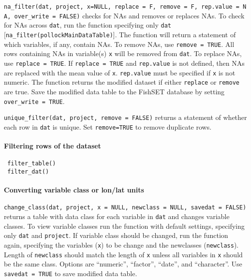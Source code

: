 \documentclass[
]{article}
\begin{document}
\texttt{na\_filter(dat,\ project,\ x=NULL,\ replace\ =\ F,\ remove\ =\ F,\ rep.value\ =\ NA,\ over\_write\ =\ FALSE)} checks for NAs and removes or replaces NAs. To check for NAs across \texttt{dat}, run the function specifying only \texttt{dat} {[}\texttt{na\_filter(pollockMainDataTable)}{]}. The function will return a statement of which variables, if any, contain NAs. To remove NAs, use \texttt{remove\ =\ TRUE}. All rows containing NAs in variable(s) \texttt{x} will be removed from \texttt{dat}. To replace NAs, use \texttt{replace\ =\ TRUE}. If \texttt{replace\ =\ TRUE} and \texttt{rep.value} is not defined, then NAs are replaced with the mean value of \texttt{x}. \texttt{rep.value} must be specified if \texttt{x} is not numeric. The function returns the modified dataset if either \texttt{replace} or \texttt{remove} are true. Save the modified data table to the FishSET database by setting \texttt{over\_write\ =\ TRUE}.

\texttt{unique\_filter(dat,\ project,\ remove\ =\ FALSE)} returns a statement of whether each row in \texttt{dat} is unique. Set \texttt{remove=TRUE} to remove duplicate rows.

\hypertarget{filtering-rows-of-the-dataset-1}{%
\paragraph{Filtering rows of the dataset}\label{filtering-rows-of-the-dataset-1}}

\begin{verbatim}
 filter_table()      
 filter_dat()     
\end{verbatim}

\hypertarget{converting-variable-class-or-lonlat-units}{%
\paragraph{Converting variable class or lon/lat units}\label{converting-variable-class-or-lonlat-units}}

\texttt{change_class(dat,\ project,\ x\ =\ NULL,\ newclass\ =\ NULL,\ savedat\ =\ FALSE)} returns a table with data class for each variable in \texttt{dat} and changes variable classes. To view variable classes run the function with default settings, specifying only \texttt{dat} and \texttt{project}. If variable class should be changed, run the function again, specifying the variables (\texttt{x}) to be change and the newclasses (\texttt{newclass}). Length of \texttt{newclass} should match the length of \texttt{x} unless all variables in \texttt{x} should be the same class. Options are ``numeric'', ``factor'', ``date'', and ``character''. Use \texttt{savedat\ =\ TRUE} to save modified data table.
\end{document}
